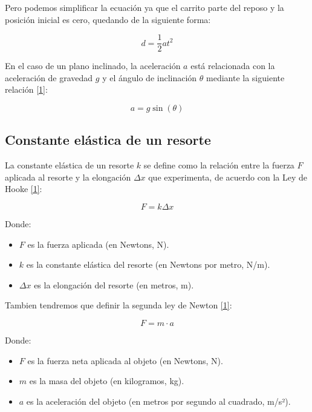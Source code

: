 \documentclass{article}
\begin{document}
\begin{multicols}{2}
        Pero podemos simplificar la ecuación ya que el carrito parte del reposo y la posición inicial 
        es cero, quedando de la siguiente forma:
            
            \begin{equation}
                d = \frac{1}{2} a t^2
            \end{equation}

        En el caso de un plano inclinado, la aceleración $a$ está relacionada con la aceleración de 
        gravedad $g$ y el ángulo de inclinación $\theta$ mediante la siguiente relación \ref{1}:

            \begin{equation}
                a = g \sin(\theta)
            \end{equation}

    \subsection*{Constante elástica de un resorte}

        La constante elástica de un resorte $k$ se define como la relación entre la fuerza $F$ aplicada al
        resorte y la elongación $\Delta x$ que experimenta, de acuerdo con la Ley de Hooke \ref{1}:

            \begin{equation}
                F = k \Delta x
            \end{equation}

        Donde:
            \begin{itemize}
                \item $F$ es la fuerza aplicada (en Newtons, N).
                \item $k$ es la constante elástica del resorte (en Newtons por metro, N/m).
                \item $\Delta x$ es la elongación del resorte (en metros, m).
            \end{itemize}
        Tambien tendremos que definir la segunda ley de Newton \ref{1}:

            \begin{equation}
                F = m \cdot a
            \end{equation}

        Donde:
            \begin{itemize}
                \item $F$ es la fuerza neta aplicada al objeto (en Newtons, N).
                \item $m$ es la masa del objeto (en kilogramos, kg).
                \item $a$ es la aceleración del objeto (en metros por segundo al cuadrado, m/s²).
            \end{itemize}


\end{multicols}
\end{document}

